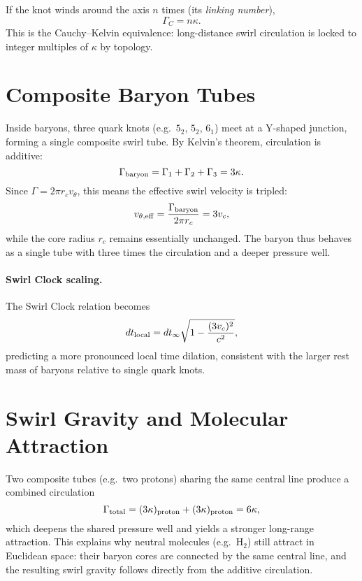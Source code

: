 \documentclass[11pt]{article}
\newcommand{\GammaC}{\Gamma_C}
\begin{document}
    If the knot winds around the axis $n$ times (its \emph{linking number}),
    \begin{equation}
    \GammaC = n \kappa.
    \end{equation}
    This is the Cauchy--Kelvin equivalence: long-distance swirl circulation is locked to integer multiples of $\kappa$ by topology.

\section{Composite Baryon Tubes}
    Inside baryons, three quark knots (e.g.\ $5_2$, $5_2$, $6_1$) meet at a Y-shaped junction, forming a single composite swirl tube.
    By Kelvin's theorem, circulation is additive:
    \begin{equation}
    \Gamma_{\rm baryon} = \Gamma_1 + \Gamma_2 + \Gamma_3
    = 3 \kappa.
    \end{equation}
    Since $\Gamma = 2\pi r_c v_\theta$, this means the effective swirl velocity is tripled:
    \begin{equation}
    v_{\theta,\rm eff} = \frac{\Gamma_{\rm baryon}}{2\pi r_c} = 3 v_c,
    \end{equation}
    while the core radius $r_c$ remains essentially unchanged.
    The baryon thus behaves as a single tube with three times the circulation and a deeper pressure well.

    \paragraph{Swirl Clock scaling.}
        The Swirl Clock relation becomes
        \begin{equation}
        dt_{\rm local} = dt_\infty \sqrt{1 - \frac{(3 v_c)^2}{c^2}},
        \end{equation}
        predicting a more pronounced local time dilation, consistent with the larger rest mass of baryons relative to single quark knots.

\section{Swirl Gravity and Molecular Attraction}
Two composite tubes (e.g.\ two protons) sharing the same central line produce a combined circulation
\[
    \Gamma_{\rm total} = (3 \kappa)_{\rm proton} + (3 \kappa)_{\rm proton} = 6 \kappa,
\]
which deepens the shared pressure well and yields a stronger long-range attraction.
This explains why neutral molecules (e.g.\ H$_2$) still attract in Euclidean space: their baryon cores are connected by the same central line, and the resulting swirl gravity follows directly from the additive circulation.
\end{document}
